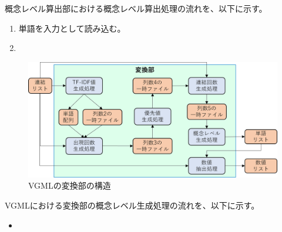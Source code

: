 概念レベル算出部における概念レベル算出処理の流れを、以下に示す。
\begin{enumerate}
    \item 単語を入力として読み込む。
    \item 
\end{enumerate}


\begin{figure}[t]
    \begin{center}
        \includegraphics[width=1.0\columnwidth]{image/vgml_transfer.png}
        \caption{VGMLの変換部の構造}
        \label{fig:vgml_transfer}
    \end{center}
\end{figure}

VGMLにおける変換部の概念レベル生成処理の流れを、以下に示す。

\begin{itemize}
    \item 
\end{itemize}